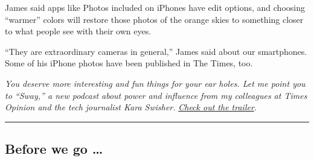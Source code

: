 James said apps like Photos included on iPhones have edit options, and
choosing ``warmer'' colors will restore those photos of the orange skies
to something closer to what people see with their own eyes.

``They are extraordinary cameras in general,'' James said about our
smartphones. Some of his iPhone photos have been published in The Times,
too.

\emph{You deserve more interesting and fun things for your ear holes.
Let me point you to ``Sway,'' a new podcast about power and influence
from my colleagues at Times Opinion and the tech journalist Kara
Swisher.}
\href{https://www.nytimes3xbfgragh.onion/2020/09/10/opinion/sway-kara-swisher-trailer.html}{\emph{Check
out the trailer}}\emph{.}

\begin{center}\rule{0.5\linewidth}{\linethickness}\end{center}

\hypertarget{before-we-go-}{%
\subsection{Before we go \ldots{}}\label{before-we-go-}}

